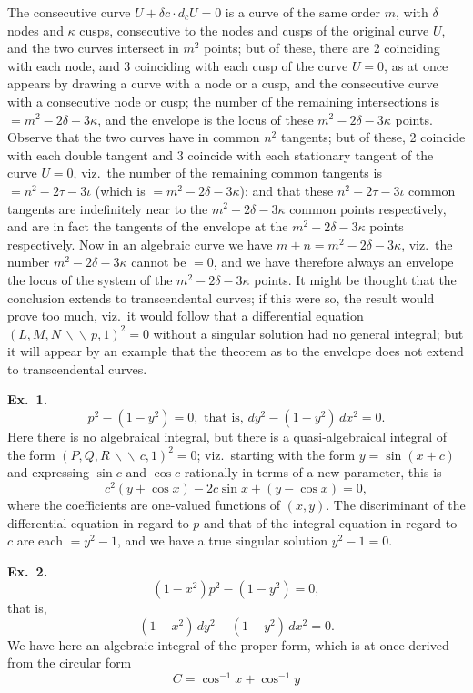 \documentclass[12pt,a4paper]{article}
\begin{document}
The consecutive curve $U + \delta c \cdot d_c U = 0$ is a curve of the same order $m$, with $\delta$ nodes and $\kappa$ cusps, consecutive to the nodes and cusps of the original curve $U$, and the two curves intersect in $m^2$ points; but of these, there are 2 coinciding with each node, and 3 coinciding with each cusp of the curve $U = 0$, as at once appears by drawing a curve with a node or a cusp, and the consecutive curve with a consecutive node or cusp; the number of the remaining intersections is $= m^2 - 2\delta - 3\kappa$, and the envelope is the locus of these $m^2 - 2\delta - 3\kappa$ points. Observe that the two curves have in common $n^2$ tangents; but of these, 2 coincide with each double tangent and 3 coincide with each stationary tangent of the curve $U = 0$, viz.\ the number of the remaining common tangents is $= n^2 - 2\tau - 3\iota$ (which is $= m^2 - 2\delta - 3\kappa$): and that these $n^2 - 2\tau - 3\iota$ common tangents are indefinitely near to the $m^2 - 2\delta - 3\kappa$ common points respectively, and are in fact the tangents of the envelope at the $m^2 - 2\delta - 3\kappa$ points respectively. Now in an algebraic curve we have $m + n = m^2 - 2\delta - 3\kappa$, viz.\ the number $m^2 - 2\delta - 3\kappa$ cannot be $= 0$, and we have therefore always an envelope the locus of the system of the $m^2 - 2\delta - 3\kappa$ points. It might be thought that the conclusion extends to transcendental curves; if this were so, the result would prove too much, viz.\ it would follow that a differential equation $(L, M, N\,\backslash\!\backslash\, p, 1)^2 = 0$ without a singular solution had no general integral; but it will appear by an example that the theorem as to the envelope does not extend to transcendental curves.

\medskip\noindent\textbf{Ex.~1.}
\[
p^2 - (1 - y^2) = 0, \text{ that is, } d y^2 - (1 - y^2)\, d x^2 = 0.
\]
Here there is no algebraical integral, but there is a quasi-algebraical integral of the form $(P, Q, R\,\backslash\!\backslash\, c, 1)^2 = 0$; viz.\ starting with the form $y = \sin(x + c)$ and expressing $\sin c$ and $\cos c$ rationally in terms of a new parameter, this is
\[
c^2 (y + \cos x) - 2 c \sin x + (y - \cos x) = 0,
\]
where the coefficients are one-valued functions of $(x, y)$. The discriminant of the differential equation in regard to $p$ and that of the integral equation in regard to $c$ are each $= y^2 - 1$, and we have a true singular solution $y^2 - 1 = 0$.

\medskip\noindent\textbf{Ex.~2.}
\[
(1 - x^2) p^2 - (1 - y^2) = 0,
\]
that is,
\[
(1 - x^2)\, d y^2 - (1 - y^2)\, d x^2 = 0.
\]
We have here an algebraic integral of the proper form, which is at once derived from the circular form
\[
C = \cos^{-1} x + \cos^{-1} y
\]
\end{document}
